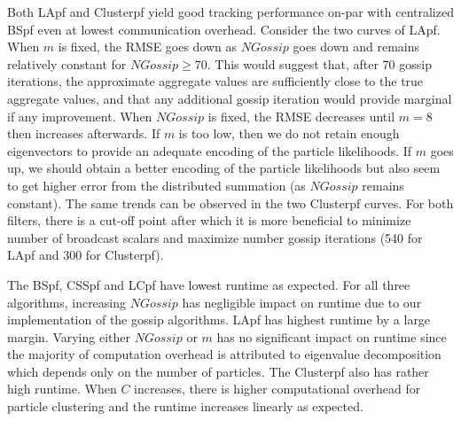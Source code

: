 \documentclass[10pt,letterpaper,final]{article}
\begin{document}
Both LApf and Clusterpf yield good tracking performance on-par with centralized BSpf even at lowest communication overhead. Consider the two curves of LApf. When $m$ is fixed, the RMSE goes down as $NGossip$ goes down and remains relatively constant for $NGossip\geq 70$. This would suggest that, after 70 gossip iterations, the approximate aggregate values are sufficiently close to the true aggregate values, and that any additional gossip iteration would provide marginal if any improvement. When $NGossip$ is fixed, the RMSE decreases until $m=8$ then increases afterwards. If $m$ is too low, then we do not retain enough eigenvectors to provide an adequate encoding of the particle likelihoods. If $m$ goes up, we should obtain a better encoding of the particle likelihoods but also seem to get higher error from the distributed summation (as $NGossip$ remains constant). The same trends can be observed in the two Clusterpf curves. For both filters, there is a cut-off point after which it is more beneficial to minimize number of broadcast scalars and maximize number gossip iterations (540 for LApf and 300 for Clusterpf). 

The BSpf, CSSpf and LCpf have lowest runtime as expected. For all three algorithms, increasing $NGossip$ has negligible impact on runtime due to our implementation of the gossip algorithms. LApf has highest runtime by a large margin. Varying either $NGossip$ or $m$ has no significant impact on runtime since the majority of computation overhead is attributed to eigenvalue decomposition which depends only on the number of particles. The Clusterpf also has rather high runtime. When $C$ increases, there is higher computational overhead for particle clustering and the runtime increases linearly as expected.  
\end{document}
